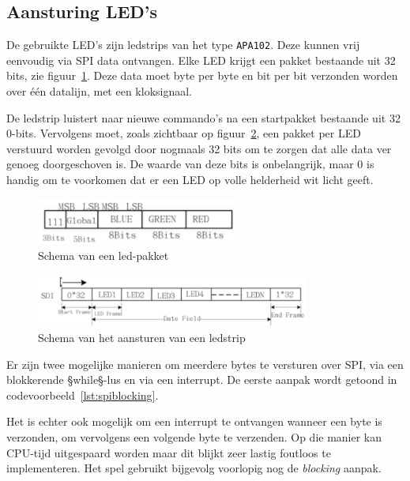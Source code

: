 \documentclass[a4paper, 12pt]{article}
\begin{document}
\subsection{Aansturing LED's}
De gebruikte LED's zijn ledstrips van het type \texttt{APA102}.
Deze kunnen vrij eenvoudig via SPI data ontvangen.
Elke LED krijgt een pakket bestaande uit 32 bits, zie
figuur~\ref{fig:ledpakket}.
Deze data moet byte per byte en bit per bit verzonden worden over één datalijn,
met een kloksignaal.

De ledstrip luistert naar nieuwe commando's na een startpakket
bestaande uit 32 0-bits. Vervolgens moet,
zoals zichtbaar op figuur~\ref{fig:ledcontrol},
een pakket per LED verstuurd worden gevolgd door
nogmaals 32 bits om te zorgen dat alle data ver genoeg doorgeschoven is.
De waarde van deze bits is onbelangrijk,
maar 0 is handig om te voorkomen dat er een LED op volle helderheid wit licht geeft.

\begin{figure}
  \centering
  \includegraphics[width=0.6\textwidth]{img/ledpakket.png}
  \caption{Schema van een led-pakket}
  \label{fig:ledpakket}
\end{figure}

\begin{figure}
  \centering
  \includegraphics[width=0.8\textwidth]{img/ledcontrol.png}
  \caption{Schema van het aansturen van een ledstrip}
  \label{fig:ledcontrol}
\end{figure}

Er zijn twee mogelijke manieren om meerdere bytes te versturen over SPI,
via een blokkerende §while§-lus en via een interrupt.
De eerste aanpak wordt getoond in codevoorbeeld~\ref{lst:spiblocking}.

Het is echter ook mogelijk om een interrupt te ontvangen wanneer een byte is
verzonden,
om vervolgens een volgende byte te verzenden. Op die manier kan CPU-tijd
uitgespaard worden maar dit blijkt zeer lastig foutloos te implementeren.
Het spel gebruikt bijgevolg voorlopig nog de \textit{blocking} aanpak.
\end{document}

